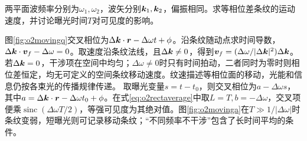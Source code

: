 \begin{example}\label{ex:o2movingfringes}
两平面波频率分别为$\omega_1,\omega_2$，波矢分别$\bm{k}_1,\bm{k}_2$，偏振相同。求等相位差条纹的运动速度，并讨论曝光时间$T$对可见度的影响。
\end{example}
\begin{solution}
图\ref{fig:o2movingq}交叉相位为$\Delta\bm{k}\cdot\bm{r}-\Delta\omega t+\phi$。沿条纹随动点求时间导数，$\Delta\bm{k}\cdot\bm{v}_f-\Delta\omega=0$。取速度沿条纹法线，且$\Delta\bm{k}\ne0$，得到$\bm{v}_f=(\Delta\omega/|\Delta\bm{k}|^2)\Delta\bm{k}$。若$\Delta\bm{k}=0$，干涉项在空间中均匀；$\Delta\omega\ne0$时只有时间拍动，二者同时为零时则相位差恒定，均无可定义的空间条纹移动速度。纹速描述等相位面的移动，光能和信息仍按各束光的传播规律传递。
取曝光变量$s=t-t_0$，则交叉相位为$a-\Delta\omega s$，其中$a=\Delta\bm{k}\cdot\bm{r}-\Delta\omega t_0+\phi$。在式\eqref{eq:o2rectaverage}中取$L=T,b=-\Delta\omega$，交叉项便乘$\operatorname{sinc}(\Delta\omega T/2)$，等强可见度为其绝对值。图\ref{fig:o2movinga}在$T\gg1/|\Delta\omega|$时条纹变弱，短曝光则可记录移动条纹；“不同频率不干涉”包含了长时间平均的条件。
\end{solution}

